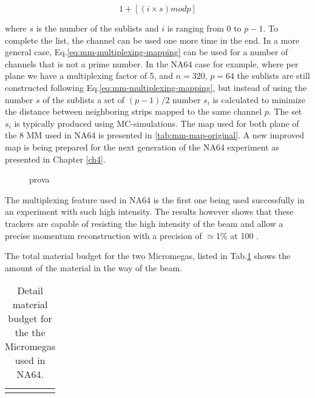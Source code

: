 \begin{equation}
  \label{eq:mm-multiplexing-mapping}
  1 + [(i \times s) mod p]
\end{equation}

where $s$ is the number of the sublists and $i$ is ranging from 0 to $p-1$. To complete the list, the channel can be used one more time in the end. In a more general case, Eq.\ref{eq:mm-multiplexing-mapping} can be used for a number of channels that is not a prime number. In the NA64 case for example, where per plane we have a multiplexing factor of 5, and $n=320$, $p=64$ the sublists are still constructed following Eq.\ref{eq:mm-multiplexing-mapping}, but instead of using the number $s$ of the sublists a set of $(p-1)/2$ number $s_i$ is calculated to minimize the distance between neighboring strips mapped to the same channel $p$. The set $s_i$ is typically produced using MC-simulations. The map used for both plane of the 8 MM used in NA64 is presented in \ref{tab:mm-map-original}. A new improved map is being prepared for the next generation of the NA64 experiment as presented in Chapter \ref{ch4}.

\begin{figure}[bth!]
  \centering
  
  \caption[example of the readout of a multiplexing detector]{prova}
  \label{fig:multiplexing-example}
\end{figure}

The multiplexing feature used in NA64 is the first one being used successfully in an experiment with such high intensity. The results however shows that these trackers are capable of resisting the high intensity of the beam and allow a precise momentum reconstruction with a precision of $\simeq$1\% at 100 \si{\gev} \cite{Banerjee:2017mdu}.

The total material budget for the two Micromegas, listed in Tab.\ref{tab:mm-mbudget} shows the amount of the material in the way of the beam. 

  \begin{table}[bth!]
    \centering
    \begin{tabular}{|l|c|c|}
      &&
    \end{tabular}
    \caption[material budget MM]{Detail material budget for the the Micromegas used in NA64.}
    \label{tab:mm-mbudget}
  \end{table}

